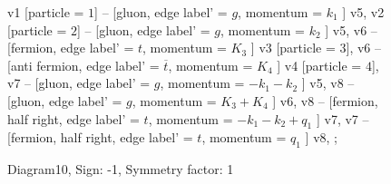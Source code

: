\documentclass{revtex4}
\begin{document}
\begin{figure}[!htb]
\begin{center}
{    %
v1 [particle = \(1\)] -- [gluon, edge label' = \(g\), momentum = \(k_{1}\) ] v5, 
v2 [particle = \(2\)] -- [gluon, edge label' = \(g\), momentum = \(k_{2}\) ] v5, 
v6 -- [fermion, edge label' = \(t\), momentum = \(K_{3}\) ] v3 [particle = \(3\)], 
v6 -- [anti fermion, edge label' = \(\overline{t}\), momentum = \(K_{4}\) ] v4 [particle = \(4\)], 
v7 -- [gluon, edge label' = \(g\), momentum = \(-k_{1} - k_{2}\) ] v5, 
v8 -- [gluon, edge label' = \(g\), momentum = \(K_{3} + K_{4}\) ] v6, 
v8 -- [fermion, half right, edge label' = \(t\), momentum = \(-k_{1} - k_{2} + q_{1}\) ] v7, 
v7 -- [fermion, half right, edge label' = \(t\), momentum = \(q_{1}\) ] v8, 
};
\end{center}
\caption{Diagram10, Sign: -1, Symmetry factor: 1}
\end{figure}
\newpage
\end{document}

